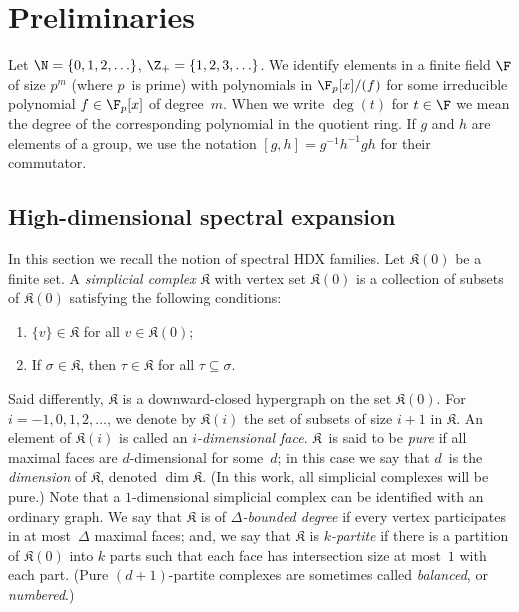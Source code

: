 \documentclass[11pt]{article}
\newcommand{\complex}{\mathfrak{K}}
\begin{document}
\section{Preliminaries}\label{sec:prelim}
Let $\N = \{0,1,2,\ldots\}$, $\Z_+ = \{1,2,3,\ldots\}$. We identify elements in a finite field $\F$ of size $p^m$ (where $p$~is prime) with polynomials in $\F_p[x]/(f)$ for some irreducible polynomial $f \in \F_p[x]$ of degree~$m$. When we write $\deg(t)$ for $t \in \F$ we mean the degree of the corresponding polynomial in the quotient ring.
If $g$ and $h$ are elements of a group, we use the notation $[g,h] = g^{-1}h^{-1}gh$ for their commutator. 

\subsection{High-dimensional spectral expansion}
In this section we recall the notion of spectral HDX families. Let $\complex(0)$ be a finite set. A \emph{simplicial complex} $\complex$ with vertex set $\complex(0)$ is a collection of subsets of $\complex(0)$ satisfying the following conditions:
\begin{enumerate}
\item $\{v\} \in \complex$ for all $v \in \complex(0)$;
\item If $\sigma \in \complex$, then $\tau \in \complex$ for all $\tau \subseteq \sigma$.
\end{enumerate}
Said differently, $\complex$ is a downward-closed hypergraph on the set $\complex(0)$.  For $i = -1, 0, 1, 2, \dots$, we denote by $\complex(i)$ the set of subsets of size $i+1$ in $\complex$. An element of $\complex(i)$ is called an \emph{$i$-dimensional face}. $\complex$~is said to be \emph{pure} if all maximal faces are $d$-dimensional for some~$d$; in this case we say that $d$~is the \emph{dimension} of $\complex$, denoted $\dim \complex$. (In this work, all simplicial complexes will be pure.)
Note that a $1$-dimensional simplicial complex can be identified with an ordinary graph.
We say that $\complex$ is of \emph{$\Delta$-bounded degree} if every vertex participates in at most~$\Delta$ maximal faces; and, we say that $\complex$ is \emph{$k$-partite} if there is a partition of $\complex(0)$ into $k$ parts such that each face has intersection size at most~$1$ with each part. (Pure $(d+1)$-partite complexes are sometimes called \emph{balanced}, or \emph{numbered}.)
\end{document}
